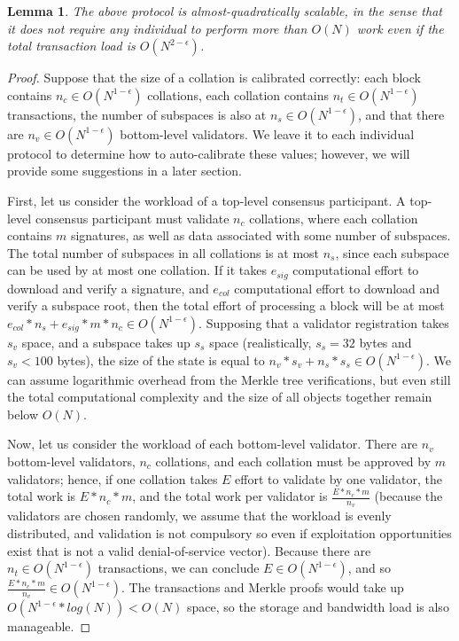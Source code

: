 \documentclass[11pt,a4paper]{article}
\theoremstyle{plain}
\newtheorem{lem}[thm]{Lemma}
\theoremstyle{definition}
\theoremstyle{remark}
\begin{document}
\begin{lem}
The above protocol is almost-quadratically scalable, in the sense that it does not require any individual to perform more than $O(N)$ work even if the total transaction load is $O(N^{2-\epsilon})$.
\end{lem}

\begin{proof}
Suppose that the size of a collation is calibrated correctly: each block contains $n_c \in O(N^{1-\epsilon})$ collations, each collation contains $n_t \in O(N^{1-\epsilon})$ transactions, the number of subspaces is also at $n_s \in O(N^{1-\epsilon})$, and that there are $n_v \in O(N^{1-\epsilon})$ bottom-level validators. We leave it to each individual protocol to determine how to auto-calibrate these values; however, we will provide some suggestions in a later section.

First, let us consider the workload of a top-level consensus participant. A top-level consensus participant must validate $n_c$ collations, where each collation contains $m$ signatures, as well as data associated with some number of subspaces. The total number of subspaces in all collations is at most $n_s$, since each subspace can be used by at most one collation. If it takes $e_{sig}$ computational effort to download and verify a signature, and $e_{col}$ computational effort to download and verify a subspace root, then the total effort of processing a block will be at most $e_{col} * n_s + e_{sig} * m * n_c \in O(N^{1-\epsilon})$. Supposing that a validator registration takes $s_v$ space, and a subspace takes up $s_s$ space (realistically, $s_s = 32$ bytes and $s_v < 100$ bytes), the size of the state is equal to $n_v * s_v + n_s * s_s \in O(N^{1-\epsilon})$. We can assume logarithmic overhead from the Merkle tree verifications, but even still the total computational complexity and the size of all objects together remain below $O(N)$.

Now, let us consider the workload of each bottom-level validator. There are $n_v$ bottom-level validators, $n_c$ collations, and each collation must be approved by $m$ validators; hence, if one collation takes $E$ effort to validate by one validator, the total work is $E * n_c * m$, and the total work per validator is $\frac{E * n_c * m}{n_v}$ (because the validators are chosen randomly, we assume that the workload is evenly distributed, and validation is not compulsory so even if exploitation opportunities exist that is not a valid denial-of-service vector). Because there are $n_t \in O(N^{1-\epsilon})$ transactions, we can conclude $E \in O(N^{1-\epsilon})$, and so $\frac{E * n_c * m}{n_v} \in O(N^{1-\epsilon})$. The transactions and Merkle proofs would take up $O(N^{1-\epsilon} * log(N)) < O(N)$ space, so the storage and bandwidth load is also manageable.
\end{proof}
\end{document}
